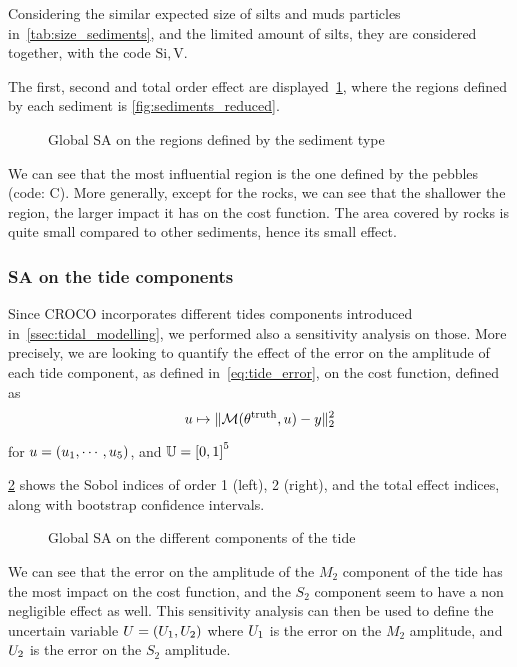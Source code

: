 \documentclass[../../Main_ManuscritThese.tex]{subfiles}
\newcommand{\CROCO}{CROCO}
\newcommand\imgpath{/home/victor/acadwriting/Manuscrit/Text/Chapter5/img/}
\begin{document}
Considering the similar
expected size of silts and muds particles
in~\cref{tab:size_sediments}, and the limited amount of silts, they
are considered together, with the code $\mathrm{Si,V}$.

The first, second and total order effect are
displayed~\cref{fig:SA_sediments}, where the regions defined by each
sediment is \cref{fig:sediments_reduced}. 

\label{ssec:SA_sediments}
\begin{figure}[ht]
  \centering
  
  \caption{\label{fig:SA_sediments} Global SA on the regions defined by the sediment type}
\end{figure}

We can see that the most influential region is the one defined by the
pebbles (code: C). More generally, except for the rocks, we can see
that the shallower the region, the larger impact it has on the cost
function. The area covered by rocks is quite small compared to other
sediments, hence its small effect.
\subsubsection{SA on the tide components}
\label{ssec:SA_tide}

Since \CROCO{} incorporates different tides components introduced
in~\cref{ssec:tidal_modelling}, we performed also a sensitivity
analysis on those. More precisely, we are looking to quantify the
effect of the error on the amplitude of each tide component, as
defined in~\cref{eq:tide_error}, on the cost
function, defined as
\begin{equation}
  u \mapsto  \| \mathcal{M}(\theta^{\mathrm{truth}}, u) - y \|_2^2
\end{equation}

for $u = (u_1,\cdots,u_5)$, and $\Uspace = \interval{0}{1}^5$

\cref{fig:SA_tides} shows the Sobol indices of order 1 (left), 2
(right), and the total effect indices, along with bootstrap confidence
intervals.
\begin{figure}[ht]
  \centering
  
  \caption{\label{fig:SA_tides} Global SA on the different components of the tide }
\end{figure}

We can see that the error on the amplitude of the $M_2$ component of
the tide has the most impact on the cost function, and the $S_2$
component seem to have a non negligible effect as well. This
sensitivity analysis can then be used to define the uncertain variable
$U = (U_1, U_2)$ where $U_1$ is the error on the $M_2$
amplitude, and $U_2$ is the error on the $S_2$ amplitude.
\end{document}
